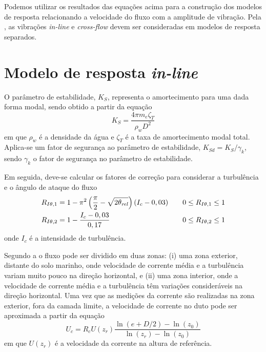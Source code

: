 Podemos utilizar os resultados das equações acima para a construção dos modelos de resposta relacionando a velocidade do fluxo com a amplitude de vibração.
Pela , as vibrações \textit{in-line} e \textit{cross-flow} devem ser consideradas em modelos de resposta separados.


\section{Modelo de resposta \textit{in-line}}\label{sec:modelo-resposta-inline}

O parâmetro de estabilidade, $K_S$, representa o amortecimento para uma dada forma modal, sendo obtido a partir da equação
\begin{equation}
\label{eq:viv-Ks}
K_S = \frac{4 \pi m_e \zeta_T}{\rho_w D^2}
\end{equation}
em que $\rho_w$ é a densidade da água e $\zeta_T$ é a taxa de amortecimento modal total.
Aplica-se um fator de segurança ao parâmetro de estabilidade, $K_\mathit{Sd} = K_S/\gamma_k$, sendo $\gamma_k$ o fator de segurança no parâmetro de estabilidade.

Em seguida, deve-se calcular os fatores de correção para considerar a turbulência e o ângulo de ataque do fluxo
\begin{equation}
\label{eq:viv-Riot}
\begin{aligned}
    R_{I\theta,1} &= 1 - \pi^2\left(\frac{\pi}{2} - \sqrt{2 \theta_\mathit{rel}}\right)(I_c - 0,03) & \quad \mbox 0 \leq R_{I\theta,1} \leq 1\\
    R_{I\theta,2} &= 1 - \frac{I_c - 0,03}{0,17}                                                    & \quad \mbox  0 \leq R_{I\theta,2} \leq 1
\end{aligned}
\end{equation}
onde $I_c$ é a intensidade de turbulência.

Segundo a  o fluxo pode ser dividido em duas zonas: (i) uma zona exterior, distante do solo marinho, onde velocidade de corrente média e a turbulência variam muito pouco na direção horizontal, e (ii) uma zona interior, onde a velocidade de corrente média e a turbulência têm variações consideráveis na direção horizontal. Uma vez que as medições da corrente são realizadas na zona exterior, fora da camada limite, a velocidade de corrente no duto pode ser aproximada a partir da equação
\begin{equation}
\label{eq:vel-corrente}
U_c = R_c U(z_r) \frac{\ln{(e+D/2)} - \ln(z_0)}{\ln (z_r)- \ln (z_0)}
\end{equation}
em que $U(z_r)$ é a velocidade da corrente na altura de referência.

